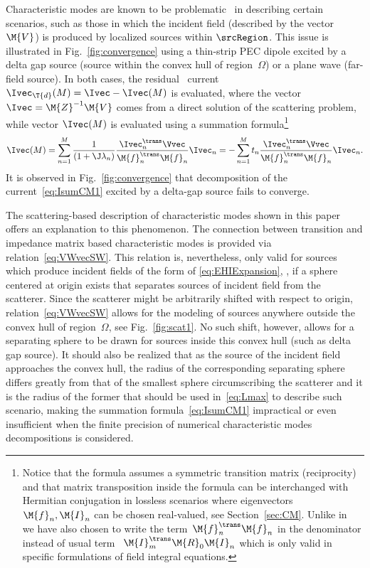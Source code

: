 \documentclass[journal]{IEEEtran}
\begin{document}
Characteristic modes are known to be problematic~\cite{YeeGarbacz_SelfAndMutualAdmittancesOfWireAntennasInTermsOfCharModes,Marta_evanVid1} in describing certain scenarios, such as those in which the incident field (described by the vector~$\M{V}$) is produced by localized sources within $\srcRegion$. This issue is illustrated in Fig.~\ref{fig:convergence} using a thin-strip PEC dipole excited by a delta gap source (source within the convex hull of region~$\varOmega$) or a plane wave (far-field source). In both cases, the residual~\cite{Marta_evanVid1} current~$\Ivec_\T{d} (M) = \Ivec - \Ivec (M)$ is evaluated, where the vector~$\Ivec = \M{Z}^{-1} \M{V} $ comes from a direct solution of the scattering problem, while vector $\Ivec (M)$ is evaluated using a summation formula\footnote{Notice that the formula assumes a symmetric transition matrix (reciprocity) and that matrix transposition inside the formula can be interchanged with Hermitian conjugation in lossless scenarios where eigenvectors~$\M{f}_n, \M{I}_n$ can be chosen real-valued, see Section~\ref{sec:CM}. Unlike in~\cite{HarringtonMautz_TheoryOfCharacteristicModesForConductingBodies} we have also chosen to write the term~$\M{f}_n^\trans \M{f}_n$ in the denominator instead of usual term ~$\M{I}_m^\trans \M{R}_0 \M{I}_n$ which is only valid in specific formulations of field integral equations.}~\cite{HarringtonMautz_TheoryOfCharacteristicModesForConductingBodies}
\begin{equation}
\Ivec (M) = \sum\limits_{n=1}^M \dfrac{1}{\left( 1 + \J \lambda_n \right)} \dfrac{\Ivec_n^\trans \Vvec}{\M{f}_n^\trans \M{f}_n} \Ivec_n = - \sum\limits_{n=1}^M t_n \dfrac{\Ivec_n^\trans \Vvec}{\M{f}_n^\trans \M{f}_n} \Ivec_n.
\label{eq:IsumCM1}
\end{equation}
It is observed in Fig.~\ref{fig:convergence} that decomposition of the current~\eqref{eq:IsumCM1} excited by a delta-gap source fails to converge. 

The scattering-based description of characteristic modes shown in this paper offers an explanation to this phenomenon. The connection between transition and impedance matrix based characteristic modes is provided via relation~\eqref{eq:VWvecSW}. This relation is, nevertheless, only valid for sources which produce incident fields of the form of \eqref{eq:EHIExpansion}, \ie{}, if a sphere centered at origin exists that separates sources of incident field from the scatterer. Since the scatterer might be arbitrarily shifted with respect to origin, relation~\eqref{eq:VWvecSW} allows for the modeling of sources anywhere outside the convex hull of region~$\varOmega$, see Fig.~\ref{fig:scat1}. No such shift, however, allows for a separating sphere to be drawn for sources inside this convex hull (such as delta gap source). It should also be realized that as the source of the incident field approaches the convex hull, the radius of the corresponding separating sphere differs greatly from that of the smallest sphere circumscribing the scatterer and it is the radius of the former that should be used in~\eqref{eq:Lmax} to describe such scenario, making the summation formula~\eqref{eq:IsumCM1} impractical or even insufficient when the finite precision of numerical characteristic modes decompositions is considered.
\end{document}
